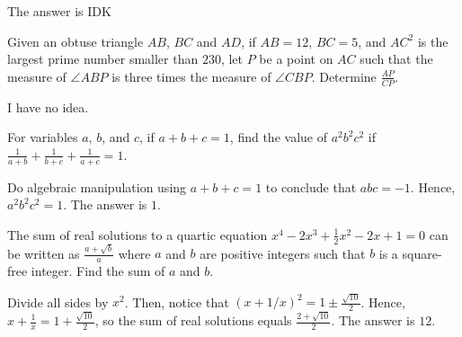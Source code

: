 \begin{solution}
The answer is IDK
\end{solution}

\begin{problem}
Given an obtuse triangle $AB$, $BC$ and $AD$, if $AB=12$, $BC=5$, and $AC^2$ is the largest prime number smaller than $230$, let $P$ be a point on $AC$ such that the measure of $\angle ABP$ is three times the measure of $\angle CBP$. Determine $\frac{AP}{CP}$.
\end{problem}

\begin{solution}
I have no idea.
\end{solution}

\begin{problem}
For variables $a$, $b$, and $c$, if $a+b+c=1$, find the value of $a^2b^2c^2$ if $\frac{1}{a+b}+\frac{1}{b+c}+\frac{1}{a+c}=1$.
\end{problem}

\begin{solution}
Do algebraic manipulation using $a+b+c=1$ to conclude that $abc=-1$. Hence, $a^2b^2c^2=1$. The answer is $1$.
\end{solution}

\begin{problem}
The sum of real solutions to a quartic equation $x^4-2x^3+\frac12x^2-2x+1=0$ can be written as $\frac{a+\sqrt{b}}{a}$ where $a$ and $b$ are positive integers such that $b$ is a square-free integer. Find the sum of $a$ and $b$.
\end{problem}

\begin{solution}
Divide all sides by $x^2$. Then, notice that $(x+1/x)^2=1\pm \frac{\sqrt{10}}{2}$. Hence, $x+\frac1x=1+\frac{\sqrt{10}}{2}$, so the sum of real solutions equals $\frac{2+\sqrt{10}}{2}$. The answer is $12$.
\end{solution}
